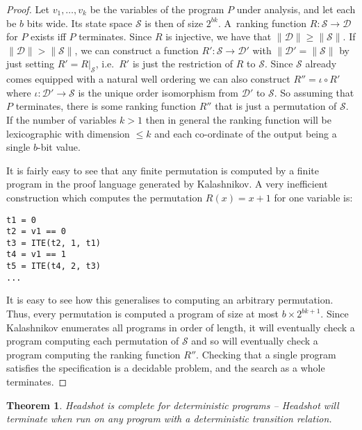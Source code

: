 \documentclass[preprint]{sigplanconf}
\newtheorem{theorem}{Theorem}
\theoremstyle{definition}
\begin{document}
\begin{proof}
%
Let $v_1, \ldots, v_k$ be the variables of the program $P$ under analysis,
and let each be $b$ bits wide.  Its state space $\mathcal{S}$ is then of
size $2^{bk}$.  A~ranking function $R: \mathcal{S} \to \mathcal{D}$ for $P$
exists iff $P$ terminates.  Since $R$ is injective, we have that $\|
\mathcal{D} \| \geq \| \mathcal{S} \|$.  If $\| \mathcal{D} \| > \|
\mathcal{S} \|$, we can construct a function $R': \mathcal{S} \to
\mathcal{D'}$ with $ \| \mathcal{D'} = \| \mathcal{S} \|$ by just setting
$R' = R|_\mathcal{S}$, i.e.~$R'$ is just the restriction of $R$ to
$\mathcal{S}$.  Since $\mathcal{S}$ already comes equipped with a natural
well ordering we can also construct $R'' = \iota \circ R'$ where $\iota:
\mathcal{D'} \to \mathcal{S}$ is the unique order isomorphism from
$\mathcal{D'}$ to $\mathcal{S}$.  So assuming that $P$ terminates, there is
some ranking function $R''$ that is just a permutation of $\mathcal{S}$.  If
the number of variables $k > 1$ then in general the ranking function will be
lexicographic with dimension $\leq k$ and each co-ordinate of the output
being a single $b$-bit value.

It is fairly easy to see that any finite permutation is computed by a finite
program in the proof language generated by {\sc Kalashnikov}.  A very
inefficient construction which computes the permutation $R(x) = x+1$ for one
variable is:
%
\begin{verbatim}
t1 = 0
t2 = v1 == 0
t3 = ITE(t2, 1, t1)
t4 = v1 == 1
t5 = ITE(t4, 2, t3)
...
\end{verbatim}
%
It is easy to see how this generalises to computing an arbitrary permutation.
Thus, every permutation is computed a program of size at most $b \times
2^{bk + 1}$.  Since {\sc Kalashnikov} enumerates all programs in order of
length, it will eventually check a program computing each permutation of
$\mathcal{S}$ and so will eventually check a program computing the ranking
function $R''$.  Checking that a single program satisfies the specification
is a decidable problem, and the search as a whole terminates.
%
\end{proof}

\begin{theorem}
 {\sc Headshot} is complete for deterministic programs -- {\sc Headshot} will terminate when run on
 any program with a deterministic transition relation.
\end{theorem}
\end{document}
